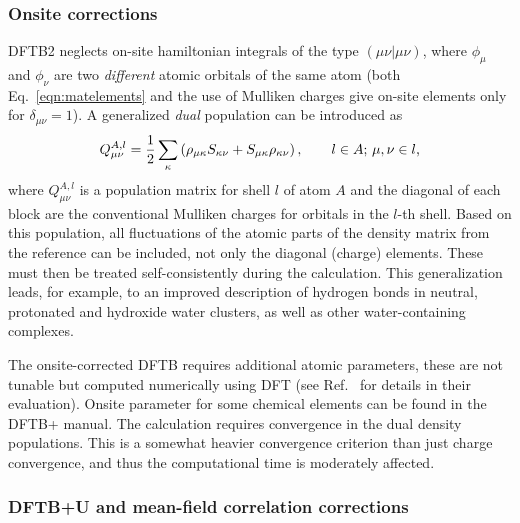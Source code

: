 \documentclass{revtex4-1}
\newcommand{\dftbp}{DFTB+}
\begin{document}
\subsubsection{Onsite corrections}
\label{sec:onsite-correction}

DFTB2 neglects on-site hamiltonian integrals of the type $(\mu\nu|\mu\nu)$,
where $\phi_\mu$ and $\phi_\nu$ are two {\em different} atomic orbitals of the
same atom (both Eq.~\eqref{eqn:matelements} and the use of Mulliken charges give
on-site elements only for $\delta_{\mu\nu} = 1$). A generalized \textit{dual}
population\cite{PhysRevB.73.045110} can be introduced as
\begin{equation}
  Q_{\mu\nu}^{A,l} = \frac{1}{2} \sum_\kappa \left(
    \rho_{\mu\kappa}S_{\kappa\nu} + S_{\mu\kappa} \rho_{\kappa\nu} \right),
  \qquad
  l\in A;\,\mu,\nu\in l
  \text,
  \label{eqn:dualpop}
\end{equation}
where $Q_{\mu\nu}^{A,l}$ is a population matrix for shell $l$ of atom $A$
and the diagonal of each block are the conventional Mulliken charges for
orbitals in the $l$-th shell. Based on this population, all fluctuations of the
atomic parts of the density matrix from the reference can be included, not only
the diagonal (charge) elements.  These must then be treated self-consistently
during the calculation. This generalization leads, for example, to an improved
description of hydrogen bonds in neutral, protonated and hydroxide water
clusters, as well as other water-containing complexes.\cite{Dominguez2015}

The onsite-corrected DFTB requires additional atomic parameters, these are not
tunable but computed numerically using DFT (see Ref.~
for details in their evaluation). Onsite parameter for some chemical elements
can be found in the \dftbp{} manual. The calculation requires convergence in the
dual density populations. This is a somewhat heavier convergence criterion than
just charge convergence, and thus the computational time is moderately
affected.


\subsubsection{DFTB+U and mean-field correlation corrections}
\end{document}
